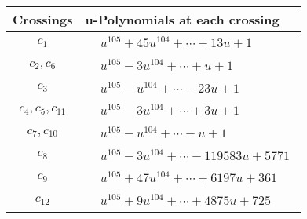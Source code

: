\documentclass[1p]{elsarticle_modified}
\theoremstyle{definition}
\begin{document}
\begin{tabular}{m{50pt}|m{274pt}}
Crossings & \hspace{64pt}u-Polynomials at each crossing \\
\hline $$\begin{aligned}c_{1}\end{aligned}$$&$\begin{aligned}
&u^{105}+45 u^{104}+\cdots+13 u+1
\end{aligned}$\\
\hline $$\begin{aligned}c_{2},c_{6}\end{aligned}$$&$\begin{aligned}
&u^{105}-3 u^{104}+\cdots+u+1
\end{aligned}$\\
\hline $$\begin{aligned}c_{3}\end{aligned}$$&$\begin{aligned}
&u^{105}- u^{104}+\cdots-23 u+1
\end{aligned}$\\
\hline $$\begin{aligned}c_{4},c_{5},c_{11}\end{aligned}$$&$\begin{aligned}
&u^{105}-3 u^{104}+\cdots+3 u+1
\end{aligned}$\\
\hline $$\begin{aligned}c_{7},c_{10}\end{aligned}$$&$\begin{aligned}
&u^{105}- u^{104}+\cdots- u+1
\end{aligned}$\\
\hline $$\begin{aligned}c_{8}\end{aligned}$$&$\begin{aligned}
&u^{105}-3 u^{104}+\cdots-119583 u+5771
\end{aligned}$\\
\hline $$\begin{aligned}c_{9}\end{aligned}$$&$\begin{aligned}
&u^{105}+47 u^{104}+\cdots+6197 u+361
\end{aligned}$\\
\hline $$\begin{aligned}c_{12}\end{aligned}$$&$\begin{aligned}
&u^{105}+9 u^{104}+\cdots+4875 u+725
\end{aligned}$\\
\hline
\end{tabular}\\~\\
\end{document}
